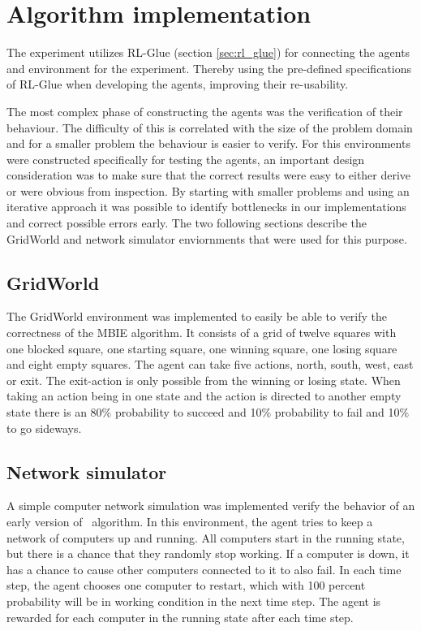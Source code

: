 \section{Algorithm implementation}
\label{sec:implementation}

The experiment utilizes RL-Glue (section \ref{sec:rl_glue}) for connecting the
agents and environment for the experiment. Thereby using the pre-defined
specifications of RL-Glue when developing the agents, improving their
re-usability. 

The most complex phase of constructing the agents was the verification of their
behaviour. The difficulty of this is correlated with the size of the problem
domain and for a smaller problem the behaviour is easier to verify. For this 
environments were constructed specifically for testing the agents, an
important design consideration was to make sure that the correct results were
easy to either derive or were obvious from inspection. By starting with smaller
problems and using an iterative approach it was possible to identify
bottlenecks in our implementations and correct possible errors early. The two
following sections describe the GridWorld and network simulator enviornments
that were used for this purpose. 

\subsection{GridWorld}
\label{sec:intro_grid_world}

The GridWorld environment was implemented to easily be able to verify the
correctness of the MBIE algorithm. It consists of a grid of twelve squares with
one blocked square, one starting square, one winning square, one losing square and
eight empty squares. The agent can take five actions, north, south, west,
east or exit. The exit-action is only possible from the winning or losing
state. When taking an action being in one state and the action is directed to
another empty state there is an 80\% probability to succeed and 10\%
probability to fail and 10\% to go sideways.

\subsection{Network simulator}

A simple computer network simulation was implemented verify the behavior of an
early version of \etre\ algorithm. In this environment, the agent tries to keep
a network of computers up and running. All computers start in the running
state, but there is a chance that they randomly stop working. If a computer is
down, it has a chance to cause other computers connected to it to also fail. In
each time step, the agent chooses one computer to restart, which with 100
percent probability will be in working condition in the next time step. The
agent is rewarded for each computer in the running state after each time step. 
